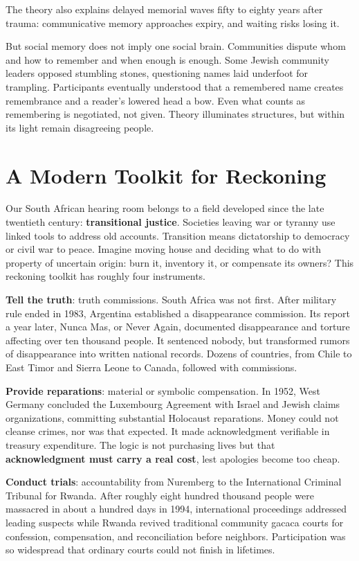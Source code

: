 The theory also explains delayed memorial waves fifty to eighty years after trauma: communicative memory approaches expiry, and waiting risks losing it.

But social memory does not imply one social brain. Communities dispute whom and how to remember and when enough is enough. Some Jewish community leaders opposed stumbling stones, questioning names laid underfoot for trampling. Participants eventually understood that a remembered name creates remembrance and a reader's lowered head a bow. Even what counts as remembering is negotiated, not given. Theory illuminates structures, but within its light remain disagreeing people.

\section{A Modern Toolkit for Reckoning}
Our South African hearing room belongs to a field developed since the late twentieth century: \textbf{transitional justice}. Societies leaving war or tyranny use linked tools to address old accounts. Transition means dictatorship to democracy or civil war to peace. Imagine moving house and deciding what to do with property of uncertain origin: burn it, inventory it, or compensate its owners? This reckoning toolkit has roughly four instruments.

\textbf{Tell the truth}: truth commissions. South Africa was not first. After military rule ended in 1983, Argentina established a disappearance commission. Its report a year later, Nunca Mas, or Never Again, documented disappearance and torture affecting over ten thousand people. It sentenced nobody, but transformed rumors of disappearance into written national records. Dozens of countries, from Chile to East Timor and Sierra Leone to Canada, followed with commissions.

\textbf{Provide reparations}: material or symbolic compensation. In 1952, West Germany concluded the Luxembourg Agreement with Israel and Jewish claims organizations, committing substantial Holocaust reparations. Money could not cleanse crimes, nor was that expected. It made acknowledgment verifiable in treasury expenditure. The logic is not purchasing lives but that \textbf{acknowledgment must carry a real cost}, lest apologies become too cheap.

\textbf{Conduct trials}: accountability from Nuremberg to the International Criminal Tribunal for Rwanda. After roughly eight hundred thousand people were massacred in about a hundred days in 1994, international proceedings addressed leading suspects while Rwanda revived traditional community gacaca courts for confession, compensation, and reconciliation before neighbors. Participation was so widespread that ordinary courts could not finish in lifetimes.

